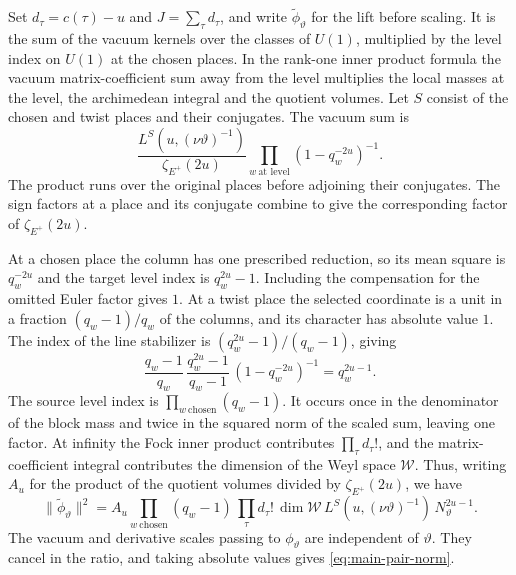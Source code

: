 Set \(d_\tau=c(\tau)-u\) and \(J=\sum_\tau d_\tau\), and write
\(\widetilde\phi_\vartheta\) for the lift before scaling. It is the
sum of the vacuum kernels over the classes of \(U(1)\), multiplied
by the level index on \(U(1)\) at the chosen places.
In the rank-one inner product formula the vacuum matrix-coefficient
sum away from the level multiplies the local masses at the level,
the archimedean integral and the quotient volumes. Let \(S\) consist
of the chosen and twist places and their conjugates. The vacuum sum is
\[
 \frac{L^S(u,(\nu\vartheta)^{-1})}{\zeta_{E^+}(2u)}
    \prod_{w\ \text{at\ level}}(1-q_w^{-2u})^{-1}.
\]
The product runs over the original places before adjoining their
conjugates. The sign factors at a place and its conjugate combine
to give the corresponding factor of \(\zeta_{E^+}(2u)\).

At a chosen place the column has one prescribed reduction, so its
mean square is \(q_w^{-2u}\) and the target level index is \(q_w^{2u}-1\).
Including the compensation for the omitted Euler factor gives \(1\).
At a twist place the selected coordinate is a unit in a fraction
\((q_w-1)/q_w\) of the columns, and its character has absolute value \(1\).
The index of the line stabilizer is \((q_w^{2u}-1)/(q_w-1)\), giving
\[
 \frac{q_w-1}{q_w}\,
 \frac{q_w^{2u}-1}{q_w-1}\,
 (1-q_w^{-2u})^{-1}=q_w^{2u-1}.
\]
The source level index is \(\prod_{w\ \mathrm{chosen}}(q_w-1)\).
It occurs once in the denominator of the block mass and twice in the
squared norm of the scaled sum, leaving one factor. At infinity the
Fock inner product contributes \(\prod_\tau d_\tau!\), and the
matrix-coefficient integral contributes the dimension of the Weyl
space \(\mathcal W\). Thus, writing \(A_u\) for the product of the
quotient volumes divided by \(\zeta_{E^+}(2u)\), we have
\[
 \|\widetilde\phi_\vartheta\|^2
 = A_u \prod_{w\ \mathrm{chosen}}(q_w-1)\,
     \prod_\tau d_\tau!\,\dim\mathcal W\,
     L^S(u,(\nu\vartheta)^{-1})\,N_\vartheta^{2u-1}.
\]
The vacuum and derivative scales passing to \(\phi_\vartheta\) are
independent of \(\vartheta\). They cancel in the ratio, and taking
absolute values gives \eqref{eq:main-pair-norm}.

